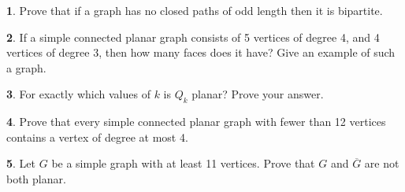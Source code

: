 \documentclass[12pt]{article}
\theoremstyle{definition}
\newtheorem{problem}{}
\begin{document}
\begin{problem}
Prove that if a graph has no closed paths of odd length then it is bipartite.
\end{problem}

\begin{problem}
If a simple connected planar graph consists of 5 vertices of degree 4, and 4 vertices of degree 3, then how many faces does it have? Give an example of such a graph.
\end{problem}

\begin{problem}
For exactly which values of $k$ is $Q_k$ planar? Prove your answer.
\end{problem}



\begin{problem}Prove that every simple connected planar graph with fewer than 12 vertices contains a vertex of degree at most 4.
\end{problem}

\begin{problem}
Let $G$ be a simple graph with at least 11 vertices. Prove that $G$ and $\overline{G}$ are not both planar.
\end{problem}
\end{document}
